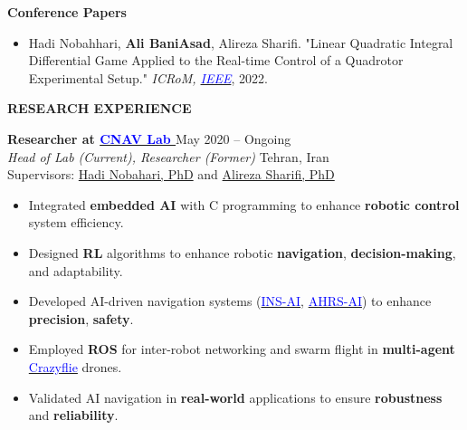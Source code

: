 \documentclass[12pt]{article}
\begin{document}
\vspace{0.2in} %
\noindent
{\bfseries Conference Papers}

\vspace{6pt}
\begin{itemize} \itemsep -2pt %
	\item Hadi Nobahhari,  \textbf{Ali BaniAsad}, Alireza Sharifi. "Linear Quadratic Integral Differential Game Applied to the Real-time Control of a Quadrotor Experimental Setup." \textit{ICRoM, \href{https://doi.org/10.1109/ICRoM57054.2022.10025263}{\textcolor{blue}{IEEE}}}, 2022.
\end{itemize}

\vspace{0.2in} %


\newpage
\begin{center}
	{\noindent \bfseries RESEARCH EXPERIENCE} %
\end{center} 

\vspace{8pt} %

\noindent
{\bfseries Researcher at
\href{https://www.linkedin.com/company/cnav-lab/}{\textcolor{blue}{CNAV Lab \faLinkedin}} \href{https://github.com/CNAVLAB}{\faGithub}
\textcolor{red}{
\href{https://youtube.com/@cnavlab?si=Fc-Y3oyKdgAmz3-5}{\faYoutube}}
} \hfill May 2020 -- Ongoing \\ 
\noindent \textit{Head of Lab (Current), Researcher (Former) }
\hfill Tehran, Iran \\ 
\noindent Supervisors: 
\href{https://ae.sharif.edu/~portal/faculty/1091235256}{Hadi Nobahari, PhD} and
\href{https://ae.sharif.edu/~portal/faculty/1730782165}{Alireza Sharifi, PhD}

\begin{itemize} %
    \item Integrated \textbf{embedded AI} with C programming to enhance \textbf{robotic control} system efficiency.
	\item Designed \textbf{RL} algorithms to enhance robotic \textbf{navigation}, \textbf{decision-making}, and adaptability.
    \item Developed AI-driven navigation systems (\href{https://github.com/alibaniasad1999/AHRS_AI}{\textcolor{blue}{INS-AI}}, \href{https://github.com/alibaniasad1999/GPS_INS}{\textcolor{blue}{AHRS-AI}}) to enhance \textbf{precision}, \textbf{safety}.
    \item Employed \textbf{ROS} for inter-robot networking and swarm flight in \textbf{multi-agent} \href{https://www.bitcraze.io/products/old-products/crazyflie-2-0/}{\textcolor{blue}{Crazyflie}} drones.
    \item Validated AI navigation in \textbf{real-world} applications to ensure \textbf{robustness} and \textbf{reliability}.
\end{itemize}
\end{document}
